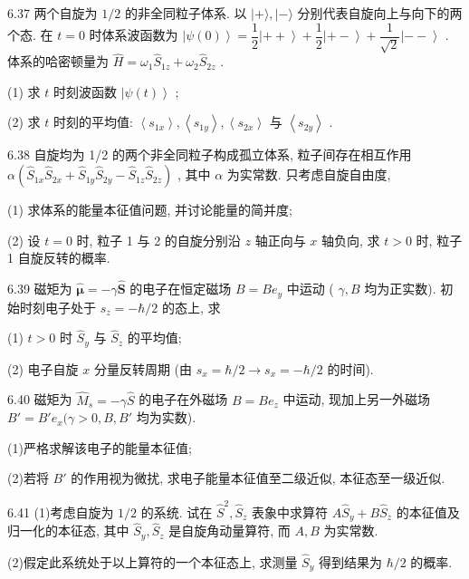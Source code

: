 \vfill\newpage

6.37 两个自旋为 $1/2$ 的非全同粒子体系. 以 $|+\rangle, |-\rangle$ 分别代表自旋向上与向下的两个态. 在 $t = 0$ 时体系波函数为 $\left|\psi(0)\right\rangle = \dfrac{1}{2}\left|++\right\rangle + \dfrac{1}{2}\left|+-\right\rangle + \dfrac{1}{\sqrt{2}}\left|--\right\rangle$ . 体系的哈密顿量为 $\hat{H} = \omega_1 \hat{S}_{1z} + \omega_2 \hat{S}_{2z}$ . 

(1) 求 $t$ 时刻波函数 $\left|\psi(t)\right\rangle$ ; 

(2) 求 $t$ 时刻的平均值: $\left\langle s_{1x}\right\rangle, \left\langle s_{1y}\right\rangle, \left\langle s_{2x}\right\rangle$ 与 $\left\langle s_{2y}\right\rangle$ .

\vfill\newpage

6.38 自旋均为 1/2 的两个非全同粒子构成孤立体系, 粒子间存在相互作用 $\alpha(\hat{S}_{1x}\hat{S}_{2x} + \hat{S}_{1y}\hat{S}_{2y} - \hat{S}_{1z}\hat{S}_{2z})$ , 其中 $\alpha$ 为实常数. 只考虑自旋自由度, 

(1) 求体系的能量本征值问题, 并讨论能量的简并度; 

(2) 设 $t = 0$ 时, 粒子 1 与 2 的自旋分别沿 $z$ 轴正向与 $x$ 轴负向, 求 $t > 0$ 时, 粒子 1 自旋反转的概率.

\vfill\newpage

6.39 磁矩为 $\hat{\pmb{\mu}} = -\gamma \hat{\pmb{S}}$ 的电子在恒定磁场 $B = B e_{y}$ 中运动 ( $\gamma, B$ 均为正实数). 初始时刻电子处于 $s_z = -\hbar / 2$ 的态上, 求

(1) $t > 0$ 时 $\hat{S}_y$ 与 $\hat{S}_z$ 的平均值; 

(2) 电子自旋 $x$ 分量反转周期 (由 $s_x = \hbar / 2 \to s_x = -\hbar / 2$ 的时间).

\vfill\newpage

6.40 磁矩为 $\hat{M}_s = -\gamma \hat{S}$ 的电子在外磁场 $B = B e_z$ 中运动, 现加上另一外磁场 $B' = B'e_x (\gamma > 0, B, B'$ 均为实数). 

(1)严格求解该电子的能量本征值; 

(2)若将 $B'$ 的作用视为微扰, 求电子能量本征值至二级近似, 本征态至一级近似.

\vfill\newpage

6.41 (1)考虑自旋为 $1 / 2$ 的系统. 试在 $\hat{S}^2, \hat{S}_z$ 表象中求算符 $A\hat{S}_y + B\hat{S}_z$ 的本征值及归一化的本征态, 其中 $\hat{S}_y, \hat{S}_z$ 是自旋角动量算符, 而 $A, B$ 为实常数. 

(2)假定此系统处于以上算符的一个本征态上, 求测量 $\hat{S}_y$ 得到结果为 $\hbar / 2$ 的概率.


